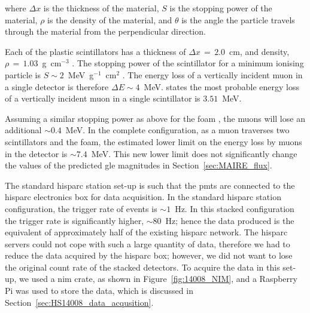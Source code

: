 where $\Delta x$ is the thickness of the material, $S$ is the stopping power of the material, $\rho$ is the density of the material, and $\theta$ is the angle the particle travels through the material from the perpendicular direction.

Each of the plastic scintillators has a thickness of $\Delta x \, = \, 2.0$~cm, and density, $\rho \, = \, 1.03$~g~cm$^{-3}$ \citep{montanus_observability_2017}. The stopping power of the scintillator for a minimum ionising particle is $S \sim 2$~MeV~g$^{-1}$~cm$^{2}$ \citep{fokkema_hisparc_2012, montanus_observability_2017}. The energy loss of a vertically incident muon in a single detector is therefore $\Delta E \sim 4$~MeV. \cite{van_dam_hisparc_2020} states the most probable energy loss of a vertically incident muon in a single scintillator is $3.51$~MeV.

Assuming a similar stopping power as above for the foam \citep{groom_muon_2001, montanus_observability_2017}, the muons will lose an additional $\sim 0.4$~MeV. In the complete configuration, as a muon traverses two scintillators and the foam, the estimated lower limit on the energy loss by muons in the detector is $\sim 7.4$~MeV. This new lower limit does not significantly change the values of the predicted \gls{gle} magnitudes in Section~\ref{sec:MAIRE_flux}.

The standard \gls{hisparc} station set-up is such that the \glspl{pmt} are connected to the \gls{hisparc} electronics box for data acquisition. In the standard \gls{hisparc} station configuration, the trigger rate of events is $\sim 1$~Hz. In this stacked configuration the trigger rate is significantly higher, $\sim 80$~Hz; hence the data produced is the equivalent of approximately half of the existing \gls{hisparc} network. The \gls{hisparc} servers could not cope with such a large quantity of data, therefore we had to reduce the data acquired by the \gls{hisparc} box; however, we did not want to lose the original count rate of the stacked detectors. To acquire the data in this set-up, we used a \gls{nim} crate, as shown in Figure~\ref{fig:14008_NIM}, and a Raspberry Pi was used to store the data, which is discussed in Section~\ref{sec:HS14008_data_acqusition}.

